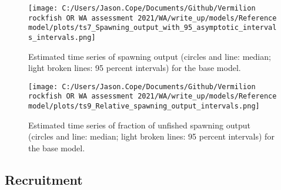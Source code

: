 \documentclass[11pt,
  english,
  a4paper,
]{article}
\begin{document}
\leavevmode\tagmcend\tagstructend\par




\begin{figure}
\centering
\texttt{[image: C:/Users/Jason.Cope/Documents/Github/Vermilion rockfish OR WA assessment 2021/WA/write\_up/models/Reference model/plots/ts7\_Spawning\_output\_with\_95\_asymptotic\_intervals\_intervals.png]}
\caption{Estimated time series of spawning output (circles and line: median; light broken lines: 95 percent intervals) for the base model.\label{fig:es-ssb}}
\end{figure}

\tagmcend\tagstructend


\begin{figure}
\centering
\texttt{[image: C:/Users/Jason.Cope/Documents/Github/Vermilion rockfish OR WA assessment 2021/WA/write\_up/models/Reference model/plots/ts9\_Relative\_spawning\_output\_intervals.png]}
\caption{Estimated time series of fraction of unfished spawning output (circles and line: median; light broken lines: 95 percent intervals) for the base model.\label{fig:es-depl}}
\end{figure}

\tagmcend\tagstructend

\clearpage


\hypertarget{recruitment}{%
\subsection*{Recruitment}\label{recruitment}}

\leavevmode\tagmcend\tagstructend

\end{document}
